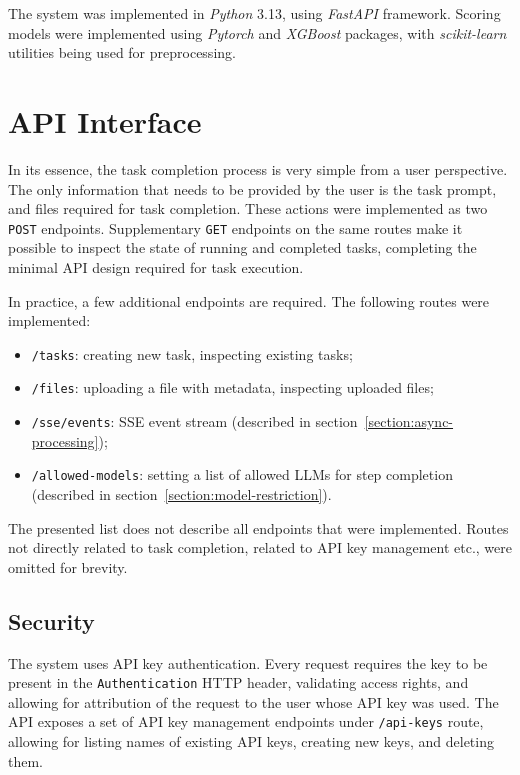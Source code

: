 \documentclass[a4paper,11pt,twoside]{report}
\theoremstyle{definition}
\begin{document}
The system was implemented in \textit{Python} 3.13, using \textit{FastAPI} \cite{fastapi2018} framework. Scoring models were implemented using \textit{Pytorch} and \textit{XGBoost} packages, with \textit{scikit-learn} utilities being used for preprocessing.

\section{API Interface}
\label{section:api-interface}

In its essence, the task completion process is very simple from a user perspective. The only information that needs to be provided by the user is the task prompt, and files required for task completion. These actions were implemented as two \texttt{POST} endpoints. Supplementary \texttt{GET} endpoints on the same routes make it possible to inspect the state of running and completed tasks, completing the minimal API design required for task execution.

In practice, a few additional endpoints are required. The following routes were implemented:

\begin{itemize}
    \item \texttt{/tasks}: creating new task, inspecting existing tasks;
    \item \texttt{/files}: uploading a file with metadata, inspecting uploaded files;
    \item \texttt{/sse/events}: SSE event stream (described in section~\ref{section:async-processing});
    \item \texttt{/allowed-models}: setting a list of allowed LLMs for step completion (described in section~\ref{section:model-restriction}).
\end{itemize}

The presented list does not describe all endpoints that were implemented. Routes not directly related to task completion, related to API key management etc., were omitted for brevity.

\subsection{Security}

The system uses API key authentication. Every request requires the key to be present in the \texttt{Authentication} HTTP header, validating access rights, and allowing for attribution of the request to the user whose API key was used. The API exposes a set of API key management endpoints under \texttt{/api-keys} route, allowing for listing names of existing API keys, creating new keys, and deleting them.
\end{document}
